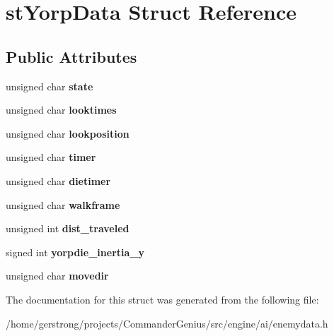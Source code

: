 \hypertarget{structst_yorp_data}{
\section{stYorpData Struct Reference}
\label{structst_yorp_data}
}
\subsection*{Public Attributes}
\begin{DoxyCompactItemize}
\item 
\hypertarget{structst_yorp_data_a43dfbc5f3f8461ff75973701e24b8b6b}{
unsigned char {\bfseries state}}
\label{structst_yorp_data_a43dfbc5f3f8461ff75973701e24b8b6b}

\item 
\hypertarget{structst_yorp_data_a5d1de3bfd20864a8f45fc617181a6f34}{
unsigned char {\bfseries looktimes}}
\label{structst_yorp_data_a5d1de3bfd20864a8f45fc617181a6f34}

\item 
\hypertarget{structst_yorp_data_a1e70941df67fb0da988c1724ab168979}{
unsigned char {\bfseries lookposition}}
\label{structst_yorp_data_a1e70941df67fb0da988c1724ab168979}

\item 
\hypertarget{structst_yorp_data_af2cd191b2b6aa45649bdcfa3eca95aa9}{
unsigned char {\bfseries timer}}
\label{structst_yorp_data_af2cd191b2b6aa45649bdcfa3eca95aa9}

\item 
\hypertarget{structst_yorp_data_afe35a17b946f8694feb725e001c48030}{
unsigned char {\bfseries dietimer}}
\label{structst_yorp_data_afe35a17b946f8694feb725e001c48030}

\item 
\hypertarget{structst_yorp_data_a83c39323cb8b8cb4339fb90844c0fc8e}{
unsigned char {\bfseries walkframe}}
\label{structst_yorp_data_a83c39323cb8b8cb4339fb90844c0fc8e}

\item 
\hypertarget{structst_yorp_data_aaefab09fcbce30367e84f2fab67037f3}{
unsigned int {\bfseries dist\_\-traveled}}
\label{structst_yorp_data_aaefab09fcbce30367e84f2fab67037f3}

\item 
\hypertarget{structst_yorp_data_a15797d273f58741fb14a29008a2cb624}{
signed int {\bfseries yorpdie\_\-inertia\_\-y}}
\label{structst_yorp_data_a15797d273f58741fb14a29008a2cb624}

\item 
\hypertarget{structst_yorp_data_a18a336d612cefdb4e3bb0f496a361d8d}{
unsigned char {\bfseries movedir}}
\label{structst_yorp_data_a18a336d612cefdb4e3bb0f496a361d8d}

\end{DoxyCompactItemize}


The documentation for this struct was generated from the following file:\begin{DoxyCompactItemize}
\item 
/home/gerstrong/projects/CommanderGenius/src/engine/ai/enemydata.h\end{DoxyCompactItemize}
